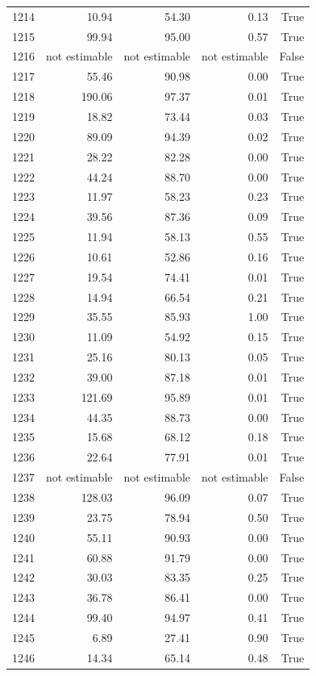\begin{longtable}{rrrrr}
1214 & 10.94 & 54.30 & 0.13 & True \\
1215 & 99.94 & 95.00 & 0.57 & True \\
1216 & not estimable & not estimable & not estimable & False \\
1217 & 55.46 & 90.98 & 0.00 & True \\
1218 & 190.06 & 97.37 & 0.01 & True \\
1219 & 18.82 & 73.44 & 0.03 & True \\
1220 & 89.09 & 94.39 & 0.02 & True \\
1221 & 28.22 & 82.28 & 0.00 & True \\
1222 & 44.24 & 88.70 & 0.00 & True \\
1223 & 11.97 & 58.23 & 0.23 & True \\
1224 & 39.56 & 87.36 & 0.09 & True \\
1225 & 11.94 & 58.13 & 0.55 & True \\
1226 & 10.61 & 52.86 & 0.16 & True \\
1227 & 19.54 & 74.41 & 0.01 & True \\
1228 & 14.94 & 66.54 & 0.21 & True \\
1229 & 35.55 & 85.93 & 1.00 & True \\
1230 & 11.09 & 54.92 & 0.15 & True \\
1231 & 25.16 & 80.13 & 0.05 & True \\
1232 & 39.00 & 87.18 & 0.01 & True \\
1233 & 121.69 & 95.89 & 0.01 & True \\
1234 & 44.35 & 88.73 & 0.00 & True \\
1235 & 15.68 & 68.12 & 0.18 & True \\
1236 & 22.64 & 77.91 & 0.01 & True \\
1237 & not estimable & not estimable & not estimable & False \\
1238 & 128.03 & 96.09 & 0.07 & True \\
1239 & 23.75 & 78.94 & 0.50 & True \\
1240 & 55.11 & 90.93 & 0.00 & True \\
1241 & 60.88 & 91.79 & 0.00 & True \\
1242 & 30.03 & 83.35 & 0.25 & True \\
1243 & 36.78 & 86.41 & 0.00 & True \\
1244 & 99.40 & 94.97 & 0.41 & True \\
1245 & 6.89 & 27.41 & 0.90 & True \\
1246 & 14.34 & 65.14 & 0.48 & True \\

\end{longtable}
